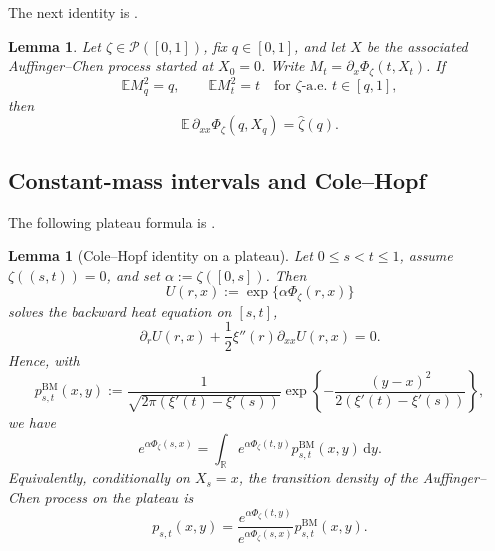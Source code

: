 \documentclass[a4paper,10pt,reqno]{amsart}
\numberwithin{equation}{section}
\newtheorem{lemma}[proposition]{Lemma}%
\newcommand{\dR}{\mathbb{R}}%
\newcommand{\dE}{\mathbb{E}}%
\newcommand{\mc}{\mathcal}
\newcommand{\dd}{\mathrm{d}}
\begin{document}
	The next identity is \cite[Lemma~B.2]{TAPIsing}.
	\begin{lemma}\label{lem:AC-susceptibility}
		Let \(\zeta\in\mc P([0,1])\), fix \(q\in[0,1]\), and let \(X\) be
		the associated Auffinger--Chen process started at \(X_0=0\). Write
		\(M_t=\partial_x\Phi_\zeta(t,X_t)\). If
		\[
		\dE M_q^2=q,
		\qquad
		\dE M_t^2=t
		\quad\text{for \(\zeta\)-a.e. \(t\in[q,1]\)},
		\]
		then
		\[
		\dE\,\partial_{xx}\Phi_\zeta(q,X_q)
		=
		\widehat\zeta(q).
		\]
	\end{lemma}
	
	\subsection{Constant-mass intervals and Cole--Hopf}
	
	The following plateau formula is \cite[Lemma~B.3]{TAPIsing}.
	\begin{lemma}[Cole--Hopf identity on a plateau]\label{lem:cole-hopf-plateau}
		Let $0\le s<t\le1$, assume $\zeta((s,t))=0$, and set $\alpha:=\zeta([0,s])$.  Then
		\[
		U(r,x):=\exp\{\alpha\Phi_\zeta(r,x)\}
		\]
		solves the backward heat equation on $[s,t]$,
		\[
		\partial_r U(r,x)+\frac12\xi''(r)\partial_{xx}U(r,x)=0 .
		\]
		Hence, with
		\[
		p^{\mathrm{BM}}_{s,t}(x,y)
		:=\frac{1}{\sqrt{2\pi(\xi'(t)-\xi'(s))}}
		\exp\left\{-\frac{(y-x)^2}{2(\xi'(t)-\xi'(s))}\right\},
		\]
		we have
		\begin{equation}\label{eq:cole-hopf-integral}
			e^{\alpha\Phi_\zeta(s,x)}
			=\int_\dR e^{\alpha\Phi_\zeta(t,y)}p^{\mathrm{BM}}_{s,t}(x,y)\,\dd y .
		\end{equation}
		Equivalently, conditionally on $X_s=x$, the transition density of the Auffinger--Chen process on the plateau is
		\begin{equation}\label{eq:AC-plateau-transition}
			p_{s,t}(x,y)
			=\frac{e^{\alpha\Phi_\zeta(t,y)}}{e^{\alpha\Phi_\zeta(s,x)}}
			p^{\mathrm{BM}}_{s,t}(x,y).
		\end{equation}
	\end{lemma}
	
\end{document}
